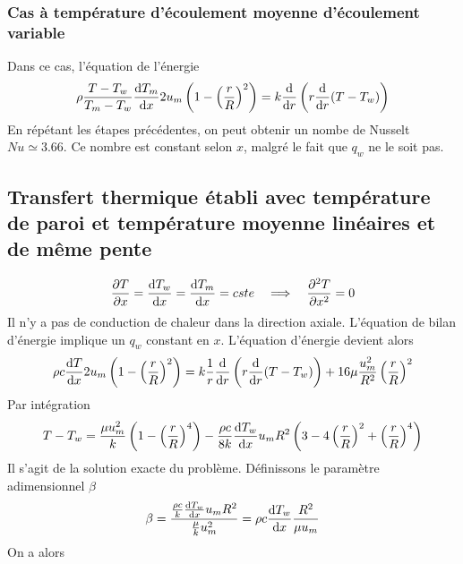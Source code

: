 \documentclass[a4paper,11pt]{report}
\newcommand{\recip}[1]{\frac{1}{#1}}
\begin{document}
      \subsubsection{Cas à température d'écoulement moyenne d'écoulement variable}
        Dans ce cas, l'équation de l'énergie
        \begin{equation}
          \rho \frac{T-T_w}{T_m - T_w}\dv{T_m}{x} 2 u_m \left(1 - \left(\frac{r}{R}\right)^2\right) = k \dv{r}\left(r \dv{r}(T-T_w)\right)
        \end{equation}
        En répétant les étapes précédentes, on peut obtenir un nombe de Nusselt $Nu \simeq 3.66$. Ce nombre est constant selon $x$, malgré le fait que $q_w$ ne le soit pas.

    \subsection{Transfert thermique établi avec température de paroi et température moyenne linéaires et de même pente}
      \begin{equation}
        \pdv{T}{x} = \dv{T_w}{x} = \dv{T_m}{x} = cste \quad \Longrightarrow \quad \pdv[2]{T}{x} = 0
      \end{equation}
      Il n'y a pas de conduction de chaleur dans la direction axiale. L'équation de bilan d'énergie implique un $q_w$ constant en $x$.
      L'équation d'énergie devient alors
      \begin{equation}
        \rho c \dv{T}{x} 2 u_m \left(1 - \left(\frac{r}{R}\right)^2\right) = k \recip{r} \dv{r}\left(r \dv{r}(T - T_w)\right) + 16 \mu \frac{u_m^2}{R^2} \left(\frac{r}{R}\right)^2
      \end{equation}
      Par intégration
      \begin{equation}
        T-T_w = \frac{\mu u_m^2}{k} \left(1-\left(\frac{r}{R}\right)^4\right) - \frac{\rho c}{8k} \dv{T_w}{x} u_m R^2 \left(3-4\left(\frac{r}{R}\right)^2 + \left(\frac{r}{R}\right)^4\right)
      \end{equation}
      Il s'agit de la solution exacte du problème. Définissons le paramètre adimensionnel $\beta$
      \begin{equation}
        \beta = \frac{\frac{\rho c}{k}\dv{T_w}{x} u_m R^2}{\frac{\mu}{k}{u_m^2}} = \rho c \dv{T_w}{x}\frac{R^2}{\mu u_m}
      \end{equation}
      On a alors
\end{document}
